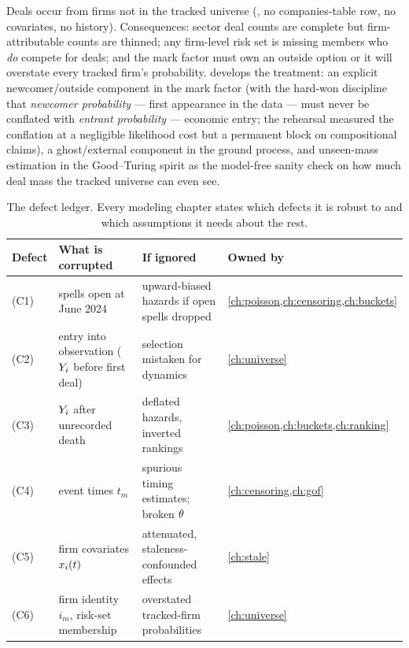 Deals occur from firms not in the tracked universe
(, no companies-table row, no
covariates, no history). Consequences: sector deal counts are complete but
firm-attributable counts are thinned; any firm-level risk set is missing
members who \emph{do} compete for deals; and the mark factor must own an
outside option or it will overstate every tracked firm's probability.
 develops the treatment: an explicit newcomer/outside
component in the mark factor (with the hard-won discipline that
\emph{newcomer probability} --- first appearance in the data --- must
never be conflated with \emph{entrant probability} --- economic entry;
the rehearsal measured the conflation at a negligible likelihood cost but
a permanent block on compositional claims), a ghost/external component in
the ground process, and unseen-mass estimation in the Good--Turing spirit
\citep{good1953,galesampson1995} as the model-free sanity check on how
much deal mass the tracked universe can even see.

\begin{table}[htbp]
\centering
\small
\begin{tabular}{p{} p{} p{} p{}}
\toprule
\textbf{Defect} & \textbf{What is corrupted} & \textbf{If ignored} &
\textbf{Owned by} \\
\midrule
(C1) & spells open at June 2024 & upward-biased hazards if open spells
dropped & \cref{ch:poisson,ch:censoring,ch:buckets} \\
(C2) & entry into observation ($Y_i$ before first deal) &
selection mistaken for dynamics & \cref{ch:universe} \\
(C3) & $Y_i$ after unrecorded death & deflated hazards, inverted
rankings & \cref{ch:poisson,ch:buckets,ch:ranking} \\
(C4) & event times $t_m$ & spurious timing estimates; broken
$\theta$ & \cref{ch:censoring,ch:gof} \\
(C5) & firm covariates $x_i(t)$ & attenuated, staleness-confounded
effects & \cref{ch:stale} \\
(C6) & firm identity $i_m$, risk-set membership & overstated tracked-firm
probabilities & \cref{ch:universe} \\
\bottomrule
\end{tabular}
\caption{The defect ledger. Every modeling chapter states which defects it
is robust to and which assumptions it needs about the rest.}
\label{tab:ch02:defects}
\end{table}

